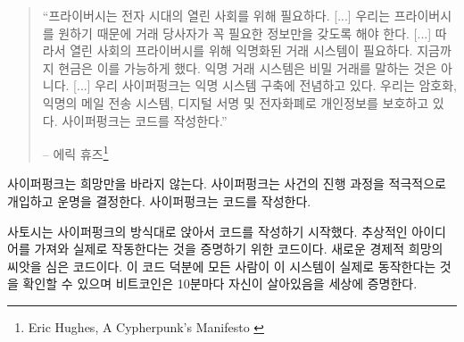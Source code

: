 \begin{quotation}\begin{samepage}
		\begin{comment}
			\enquote{Privacy is necessary for an open society in the electronic age.
				[...] Since we desire privacy, we must ensure that each party to a
				transaction have knowledge only of that which is directly necessary
				for that transaction. [...]
				Therefore, privacy in an open society requires anonymous transaction
				systems. Until now, cash has been the primary such system. An
				anonymous transaction system is not a secret transaction system.
				[...]
				We the Cypherpunks are dedicated to building anonymous systems. We are
				defending our privacy with cryptography, with anonymous mail
				forwarding systems, with digital signatures, and with electronic
				money.
				Cypherpunks write code.}
		\end{comment}
		\enquote{프라이버시는 전자 시대의 열린 사회를 위해 필요하다. [...]
			우리는 프라이버시를 원하기 때문에 거래 당사자가 꼭 필요한 정보만을 갖도록 해야 한다. [...]
			따라서 열린 사회의 프라이버시를 위해 익명화된 거래 시스템이 필요하다.
			지금까지 현금은 이를 가능하게 했다. 익명 거래 시스템은 비밀 거래를 말하는 것은 아니다. [...]
			우리 사이퍼펑크는 익명 시스템 구축에 전념하고 있다.
			우리는 암호화, 익명의 메일 전송 시스템, 디지털 서명 및 전자화폐로 개인정보를 보호하고 있다.
			사이퍼펑크는 코드를 작성한다.}
		\begin{flushright} -- 에릭 휴즈\footnote{Eric Hughes, A Cypherpunk's Manifesto \cite{cypherpunk-manifesto}}
\end{flushright}\end{samepage}\end{quotation}

\begin{comment}
	Cypherpunks do not find comfort in hopes and wishes. They actively
	interfere with the course of events and shape their own destiny.
	Cypherpunks write code.
\end{comment}
사이퍼펑크는 희망만을 바라지 않는다.
사이퍼펑크는 사건의 진행 과정을 적극적으로 개입하고 운명을 결정한다.
사이퍼펑크는 코드를 작성한다.

\begin{comment}
	Thus, in true cypherpunk fashion, Satoshi sat down and started to write
	code. Code which took an abstract idea and proved to the world that it
	actually worked. Code which planted the seed of a new economic reality.
	Thanks to this code, everyone can verify that this novel system actually
	works, and every 10 minutes or so Bitcoin proofs to the world that it is
	still living.
\end{comment}
사토시는 사이퍼펑크의 방식대로 앉아서 코드를 작성하기 시작했다.
추상적인 아이디어를 가져와 실제로 작동한다는 것을 증명하기 위한 코드이다.
새로운 경제적 희망의 씨앗을 심은 코드이다.
이 코드 덕분에 모든 사람이 이 시스템이 실제로 동작한다는 것을 확인할 수 있으며
비트코인은 10분마다 자신이 살아있음을 세상에 증명한다.

